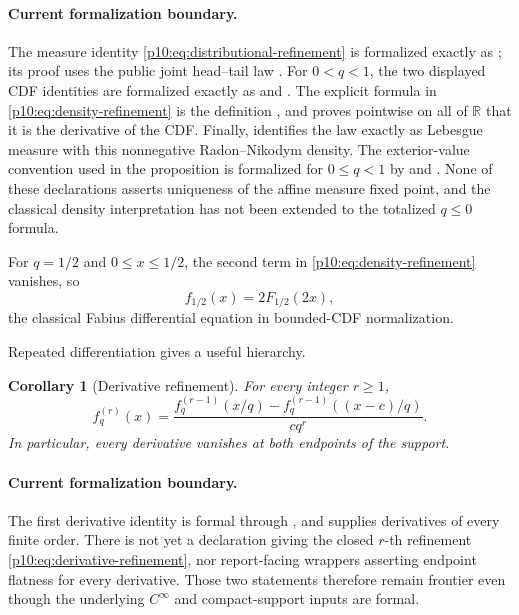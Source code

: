 \documentclass[11pt]{article}
\numberwithin{equation}{section}
\newtheorem{corollary}[theorem]{Corollary}
\theoremstyle{definition}
\theoremstyle{remark}
\newcommand{\R}{\mathbb R}
\begin{document}
\paragraph{Current formalization boundary.}
The measure identity \eqref{p10:eq:distributional-refinement} is formalized exactly as
; its proof uses the public joint head--tail
law .  For \(0<q<1\), the two
displayed CDF identities are formalized exactly as
 and
.  The explicit formula in
\eqref{p10:eq:density-refinement} is the definition , and
 proves pointwise on all of \(\R\) that it is the
derivative of the CDF.  Finally,
 identifies the law exactly as Lebesgue
measure with this nonnegative Radon--Nikodym density.  The exterior-value convention used
in the proposition is formalized for \(0\le q<1\) by
 and
.  None of these declarations asserts uniqueness
of the affine measure fixed point, and the classical density interpretation has not been
extended to the totalized \(q\le0\) formula.

For $q=1/2$ and $0\le x\le1/2$, the second term in
\eqref{p10:eq:density-refinement} vanishes, so
\[
 f_{1/2}(x)=2F_{1/2}(2x),
\]
the classical Fabius differential equation in bounded-CDF normalization.

Repeated differentiation gives a useful hierarchy.

\begin{corollary}[Derivative refinement]
\label{p10:cor:derivative-refinement}
For every integer $r\ge1$,
\begin{equation}
 f_q^{(r)}(x)
 =\frac{f_q^{(r-1)}(x/q)-f_q^{(r-1)}((x-c)/q)}{c q^r}.         \label{p10:eq:derivative-refinement}
\end{equation}
In particular, every derivative vanishes at both endpoints of the support.
\end{corollary}

\paragraph{Current formalization boundary.}
The first derivative identity is formal through
, and
 supplies derivatives of every finite order.
There is not yet a declaration giving the closed \(r\)-th refinement
\eqref{p10:eq:derivative-refinement}, nor report-facing wrappers asserting endpoint
flatness for every derivative.  Those two statements therefore remain frontier even though
the underlying \(C^\infty\) and compact-support inputs are formal.
\end{document}
